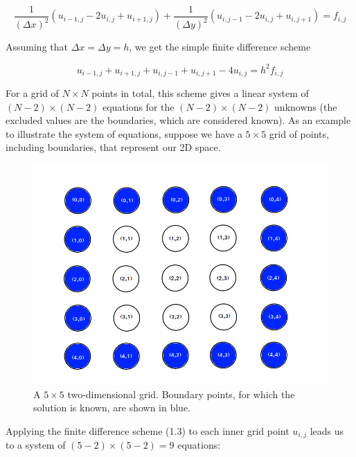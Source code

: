 \documentclass[11pt]{report}
\begin{document}
\begin{equation}
\frac{1}{(\Delta x)^2}(u_{i-1,j} -2u_{i,j} + u_{i+1,j}) + 
\frac{1}{(\Delta y)^2}(u_{i,j-1} -2u_{i,j} + u_{i,j+1}) = f_{i,j}
\end{equation}

Assuming that $\Delta x = \Delta y = h$, we get the simple finite difference scheme

\begin{equation}
u_{i-1,j} + u_{i+1,j} + u_{i,j-1} + u_{i,j+1} - 4u_{i,j} = h^2 f_{i,j}
\end{equation}

For a grid of $N \times N$ points in total, this scheme gives a linear system of $(N-2) \times (N-2)$ equations for the $(N-2) \times (N-2)$ unknowns (the excluded values are the boundaries, which are considered known). As an example to illustrate the system of equations, suppose we have a $5 \times 5$ grid of points, including boundaries, that represent our 2D space. 

\begin{figure}[h]
\centering
\includegraphics[scale=0.35]{images/grid}
\caption{A $5 \times 5$ two-dimensional grid. 
Boundary points, for which the solution is known, are shown in blue. }
\label{fig:Space grid 5x5}
\end{figure}

Applying the finite difference scheme (1.3) to each inner grid point $u_{i,j}$ leads us to a system of $(5-2) \times (5-2) = 9$ equations:
\end{document}

